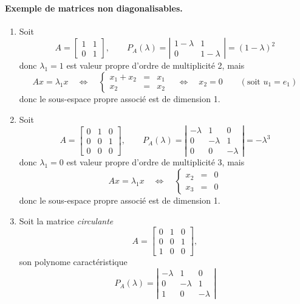 \paragraph*{Exemple de matrices non diagonalisables.}
\begin{enumerate}
 \item Soit
 $$
 A = \left[\begin{array}{cc} 1 & 1 \\ 0 & 1 \end{array}\right],
 \qquad 
 P_A(\lambda) 
 = \left|\begin{array}{cc} 1-\lambda & 1 \\ 0 & 1-\lambda \end{array}\right|
 = (1 - \lambda)^2
 $$
 donc $\lambda_1 = 1$ est valeur propre d'ordre de multiplicité 2, mais
 $$
 Ax = \lambda_1 x \quad \Leftrightarrow \quad 
 \left\{\begin{array}{rcl} x_1 + x_2 & = & x_1 \\ x_2 & = & x_2 \end{array} \right. \quad \Leftrightarrow \quad 
 x_2 = 0
 \qquad (\text{soit } u_1 = e_1)
 $$
 donc le sous-espace propre associé est de dimension 1.
 \item Soit 
 $$
 A = \left[\begin{array}{rrr} 0 & 1 & 0 \\ 0 & 0 & 1 \\ 0 & 0 & 0 \end{array}\right],
 \qquad 
 P_A(\lambda) 
 = \left|\begin{array}{rrr} -\lambda & 1 & 0 \\ 0 & -\lambda & 1 \\ 0 & 0 & -\lambda \end{array}\right|
 = -\lambda^3
 $$
 donc $\lambda_1 = 0$ est valeur propre d'ordre de multiplicité 3, mais
 $$
 A x = \lambda_1 x \quad \Leftrightarrow \quad 
 \left\{\begin{array}{rcl} x_2 & = & 0 \\ x_3 & = & 0 \end{array} \right.
 $$
 donc le sous-espace propre associé est de dimension 1.
 \item Soit la matrice {\em circulante}
 $$
 A = \left[\begin{array}{rrr} 0 & 1 & 0 \\ 0 & 0 & 1 \\ 1 & 0 & 0 \end{array}\right],
 $$ 
 son polynome caractéristique
 $$
 P_A(\lambda) 
 = \left|\begin{array}{rrr} -\lambda & 1 & 0 \\ 0 & -\lambda & 1 \\ 1 & 0 & -\lambda \end{array}\right|
$$
\end{enumerate}
